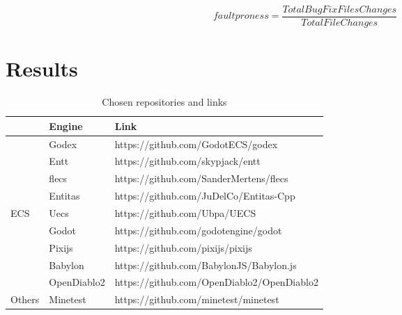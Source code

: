 \documentclass{IEEEcsmag}
\begin{document}
\begin{equation}
    faultproness = \frac{TotalBugFixFilesChanges}{TotalFileChanges}
\end{equation}




\section{Results}
\begin{table}[]
    \begin{tabular}{|l|l|l|}
        \hline
        \cellcolor[HTML]{000000} & Engine      & Link                                       \\ \hline
                                 & Godex       & https://github.com/GodotECS/godex          \\ \cline{2-3} 
                                 & Entt        & https://github.com/skypjack/entt           \\ \cline{2-3} 
                                 & flecs       & https://github.com/SanderMertens/flecs     \\ \cline{2-3} 
                                 & Entitas     & https://github.com/JuDelCo/Entitas-Cpp     \\ \cline{2-3} 
        \multirow{-5}{*}{ECS}    & Uecs        & https://github.com/Ubpa/UECS               \\ \hline
                                 & Godot       & https://github.com/godotengine/godot       \\ \cline{2-3} 
                                 & Pixijs      & https://github.com/pixijs/pixijs           \\ \cline{2-3} 
                                 & Babylon     & https://github.com/BabylonJS/Babylon.js    \\ \cline{2-3} 
                                 & OpenDiablo2 & https://github.com/OpenDiablo2/OpenDiablo2 \\ \cline{2-3} 
        \multirow{-5}{*}{Others} & Minetest    & https://github.com/minetest/minetest       \\ \hline
    \end{tabular}
    \caption{Chosen repositories and links}
\end{table}
\end{document}
